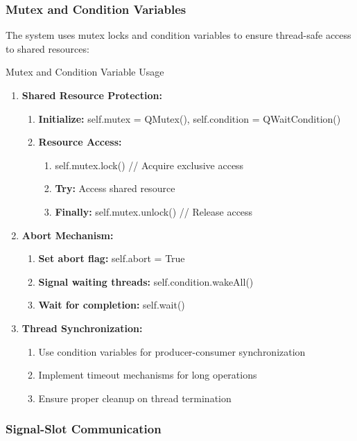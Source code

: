 \documentclass[12pt,a4paper]{article}
\begin{document}
\subsubsection{Mutex and Condition Variables}

The system uses mutex locks and condition variables to ensure thread-safe access to shared resources:

\begin{algorithm}
\caption{Mutex and Condition Variable Usage}
\begin{enumerate}
    \item \textbf{Shared Resource Protection:}
    \begin{enumerate}
        \item \textbf{Initialize:} self.mutex = QMutex(), self.condition = QWaitCondition()
        \item \textbf{Resource Access:}
        \begin{enumerate}
            \item self.mutex.lock()  // Acquire exclusive access
            \item \textbf{Try:} Access shared resource
            \item \textbf{Finally:} self.mutex.unlock()  // Release access
        \end{enumerate}
    \end{enumerate}
    \item \textbf{Abort Mechanism:}
    \begin{enumerate}
        \item \textbf{Set abort flag:} self.abort = True
        \item \textbf{Signal waiting threads:} self.condition.wakeAll()
        \item \textbf{Wait for completion:} self.wait()
    \end{enumerate}
    \item \textbf{Thread Synchronization:}
    \begin{enumerate}
        \item Use condition variables for producer-consumer synchronization
        \item Implement timeout mechanisms for long operations
        \item Ensure proper cleanup on thread termination
    \end{enumerate}
\end{enumerate}
\end{algorithm}

\subsubsection{Signal-Slot Communication}
\end{document}
